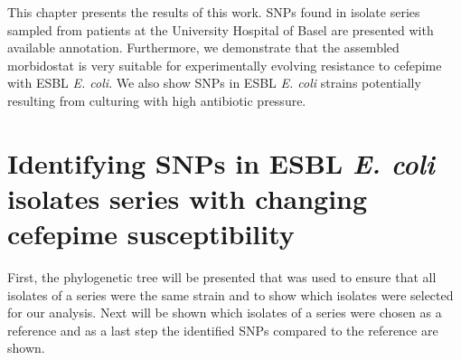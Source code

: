 This chapter presents the results of this work. SNPs found in isolate series sampled from patients at the University Hospital of Basel are presented with available annotation. Furthermore, we demonstrate that the assembled morbidostat is very suitable for experimentally evolving resistance to cefepime with ESBL \textit{E. coli}. We also show SNPs in ESBL \textit{E. coli} strains potentially resulting from culturing with high antibiotic pressure.
\section{Identifying SNPs in ESBL \textit{E. coli} isolates series with changing cefepime susceptibility}
First, the phylogenetic tree will be presented that was used to ensure that all isolates of a series were the same strain and to show which isolates were selected for our analysis. Next will be shown which isolates of a series were chosen as a reference and as a last step the identified SNPs compared to the reference are shown. 
